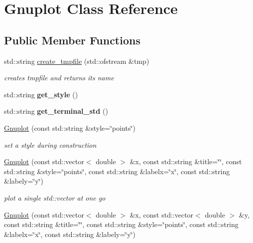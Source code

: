 \hypertarget{class_gnuplot}{\section{Gnuplot Class Reference}
\label{class_gnuplot}
}
\subsection*{Public Member Functions}
\begin{DoxyCompactItemize}
\item 
std\-::string \hyperlink{class_gnuplot_a8ced9e766e0677b938178dafe9264ff7}{create\-\_\-tmpfile} (std\-::ofstream \&tmp)
\begin{DoxyCompactList}\small\item\em creates tmpfile and returns its name \end{DoxyCompactList}\item 
\hypertarget{class_gnuplot_af51b1d33cffebc835a4b493cce1b0bce}{std\-::string {\bfseries get\-\_\-style} ()}\label{class_gnuplot_af51b1d33cffebc835a4b493cce1b0bce}

\item 
\hypertarget{class_gnuplot_ae2cd259922eb5d9486a4c5082c16e028}{std\-::string {\bfseries get\-\_\-terminal\-\_\-std} ()}\label{class_gnuplot_ae2cd259922eb5d9486a4c5082c16e028}

\item 
\hypertarget{class_gnuplot_a187eb517b362cf379492fe7f1621ee50}{\hyperlink{class_gnuplot_a187eb517b362cf379492fe7f1621ee50}{Gnuplot} (const std\-::string \&style=\char`\"{}points\char`\"{})}\label{class_gnuplot_a187eb517b362cf379492fe7f1621ee50}

\begin{DoxyCompactList}\small\item\em set a style during construction \end{DoxyCompactList}\item 
\hypertarget{class_gnuplot_a8ceac5808e42665c1dee305ae7ea9070}{\hyperlink{class_gnuplot_a8ceac5808e42665c1dee305ae7ea9070}{Gnuplot} (const std\-::vector$<$ double $>$ \&x, const std\-::string \&title=\char`\"{}\char`\"{}, const std\-::string \&style=\char`\"{}points\char`\"{}, const std\-::string \&labelx=\char`\"{}x\char`\"{}, const std\-::string \&labely=\char`\"{}y\char`\"{})}\label{class_gnuplot_a8ceac5808e42665c1dee305ae7ea9070}

\begin{DoxyCompactList}\small\item\em plot a single std\-::vector at one go \end{DoxyCompactList}\item 
\hypertarget{class_gnuplot_a24327b6116c71acdc195eadf665c67cb}{\hyperlink{class_gnuplot_a24327b6116c71acdc195eadf665c67cb}{Gnuplot} (const std\-::vector$<$ double $>$ \&x, const std\-::vector$<$ double $>$ \&y, const std\-::string \&title=\char`\"{}\char`\"{}, const std\-::string \&style=\char`\"{}points\char`\"{}, const std\-::string \&labelx=\char`\"{}x\char`\"{}, const std\-::string \&labely=\char`\"{}y\char`\"{})}\label{class_gnuplot_a24327b6116c71acdc195eadf665c67cb}


\end{DoxyCompactItemize}

